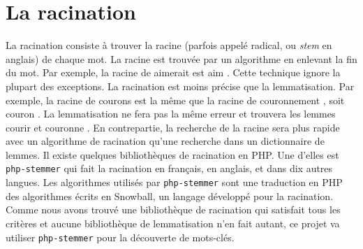 \section{La racination}
La racination consiste \`a trouver la racine (parfois appel\'e radical, ou \emph{stem} en anglais) de chaque mot.
La racine est trouv\'ee par un algorithme en enlevant la fin du mot.
Par exemple, la racine de \og aimerait \fg{} est \og aim \fg{}.
Cette technique ignore la plupart des exceptions.
La racination est moins pr\'ecise que la lemmatisation.
Par exemple, la racine de \og courons \fg{} est la m\^eme que la racine de \og couronnement \fg{}, soit \og couron \fg{}.
La lemmatisation ne fera pas la m\^eme erreur et trouvera les lemmes \og courir \fg{} et \og couronne \fg{}.
En contrepartie, la recherche de la racine sera plus rapide avec un algorithme de racination qu'une recherche dans un dictionnaire de lemmes.
Il existe quelques biblioth\`eques de racination en PHP.
Une d'elles est \texttt{php-stemmer}\cite{phpstemmer} qui fait la racination en fran\c{c}ais, en anglais, et dans dix autres langues.
Les algorithmes utilis\'es par \texttt{php-stemmer} sont une traduction en PHP des algorithmes \'ecrits en Snowball, un langage d\'evelopp\'e pour la racination.
Comme nous avons trouv\'e une biblioth\`eque de racination qui satisfait tous les crit\`eres et aucune biblioth\`eque de lemmatisation n'en fait autant, ce projet va utiliser \texttt{php-stemmer} pour la d\'ecouverte de mots-cl\'es.
